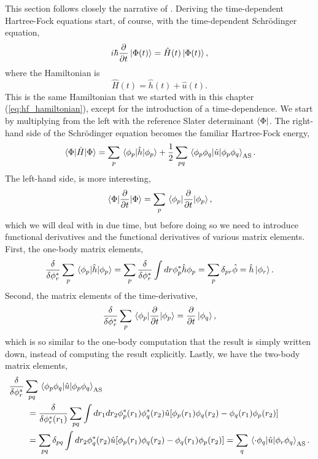 This section follows closely the narrative of \citeauthor{hochstuhl2014time}\cite{hochstuhl2014time}.
Deriving the time-dependent Hartree-Fock equations start,
of course, with the time-dependent Schrödinger equation,
\begin{equation}
    i\hbar \frac{\partial}{\partial t}\ket{\Phi(t)} = \hat{H}(t)\ket{\Phi(t)},
\end{equation}
where the Hamiltonian is 
\begin{equation}
    \hat{H}(t) = \hat{h}(t) + \hat{u}(t).
\end{equation}
This is the same Hamiltonian that we started with in this chapter (\autoref{eq:hf_hamiltonian}),
except for the introduction of a 
time-dependence. We start by multiplying from the left with the reference Slater
determinant $\bra{\Phi}$. The right-hand side of the Schrödinger equation becomes
the familiar Hartree-Fock energy,
\begin{equation}
    \mel{\Phi}{\hat{H}}{\Phi} 
    = \sum_p \mel{\phi_p}{\hat{h}}{\phi_p}
    + \frac{1}{2} \sum_{pq}\mel{\phi_p\phi_q}{\hat{u}}{\phi_p\phi_q}_\text{AS}.
\end{equation}
The left-hand side, is more interesting,
\begin{equation}
    \mel{\Phi}{\frac{\partial}{\partial t}}{\Phi} 
    = \sum_p \mel{\phi_p}{\frac{\partial}{\partial t}}{\phi_p},
\end{equation}
which we will deal with in due time, but before doing so we need to introduce 
functional derivatives and the functional derivatives of various matrix elements.
First, the one-body matrix elements,
\begin{equation}
        \frac{\delta}{\delta\phi^*_r} \sum_p \mel{\phi_p}{\hat{h}}{\phi_p}
        = \sum_p \frac{\delta}{\delta \phi^*_r}
            \int dr \phi_p^* \hat{h} \phi_p 
        = \sum_p \delta_{pr} \hat{\phi} = \hat{h}\ket{\phi_r}.
\end{equation}
Second, the matrix elements of the time-derivative,
\begin{equation}
    \frac{\delta}{\delta \phi_r^*} \sum_p\mel{\phi_p}{\frac{\partial}{\partial t}}{\phi_p}
    = \frac{\partial}{\partial t} \ket{\phi_q},
\end{equation}
which is so similar to the one-body computation that the result is simply written down,
instead of computing the result explicitly.
Lastly, we have the two-body matrix elements,
\begin{equation}
    \begin{aligned}
        \frac{\delta}{\delta \phi_r^*} &\sum_{pq}
            \mel{\phi_p\phi_q}{\hat{u}}{\phi_p\phi_q}_\text{AS} \\
        &\ = \frac{\delta}{\delta \phi_r^*(r_1)} \sum_{pq} \int dr_1 dr_2 
            \phi_p^*(r_1) \phi_q^*(r_2)\hat{u}[\phi_p(r_1)\phi_q(r_2) - \phi_q(r_1)\phi_p(r_2)] \\
        &\ = \sum_{pq}\delta_{pq} \int dr_2 \phi_q^*(r_2) 
            \hat{u} [\phi_p(r_1) \phi_q(r_2) - \phi_q(r_1)\phi_p(r_2)]
        = \sum_q \mel{\cdot \phi_q}{\hat{u}}{\phi_r\phi_q}_\text{AS}.
    \end{aligned}
\end{equation}

